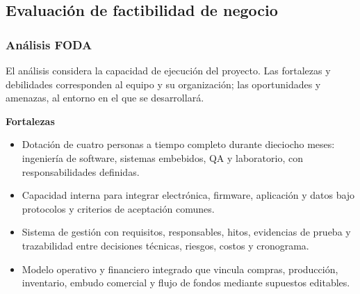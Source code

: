 \subsection{Evaluación de factibilidad de negocio}







\subsubsection{Análisis FODA}




El análisis considera la capacidad de ejecución del proyecto. Las fortalezas y debilidades corresponden al equipo y su organización; las oportunidades y amenazas, al entorno en el que se desarrollará.

\noindent\textbf{Fortalezas}
\begin{itemize}
    \item Dotación de cuatro personas a tiempo completo durante dieciocho meses: ingeniería de software, sistemas embebidos, QA y laboratorio, con responsabilidades definidas.
    \item Capacidad interna para integrar electrónica, firmware, aplicación y datos bajo protocolos y criterios de aceptación comunes.
    \item Sistema de gestión con requisitos, responsables, hitos, evidencias de prueba y trazabilidad entre decisiones técnicas, riesgos, costos y cronograma.
    \item Modelo operativo y financiero integrado que vincula compras, producción, inventario, embudo comercial y flujo de fondos mediante supuestos editables.
\end{itemize}

